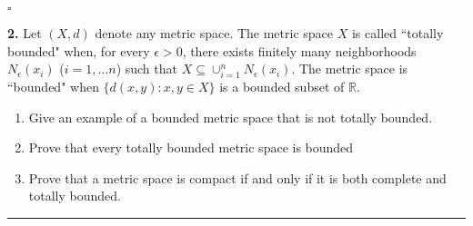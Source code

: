 \documentclass[11pt]{article}
\begin{document}
\hfill $\square$




\newpage


\noindent \textbf{2.}  Let $(X,d)$ denote any metric space.  The metric space $X$ is called ``totally bounded" when,  for every $\epsilon > 0$,   there exists finitely many neighborhoods $N_\epsilon ( x_i )$  ($i=1,\ldots n$)
such that $X \subseteq \cup_{i=1}^n N_\epsilon ( x_i ) $.  The metric space is ``bounded" when $\{d(x,y): x,y \in X \}$ is a bounded subset of $\mathbb{R}$.
\begin{enumerate}
	\item  Give an example of a bounded metric space that is not totally bounded.
	\item  Prove that every totally bounded metric space is bounded
	\item  Prove that a metric space is compact if and only if it is both complete and totally bounded.
\end{enumerate}

\hrule
\end{document}
